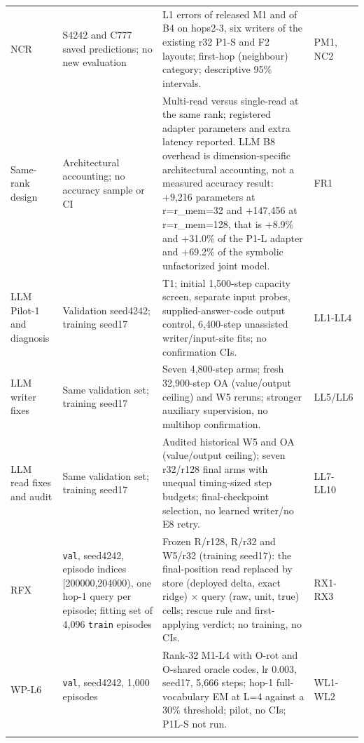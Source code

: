 {\begin{longtable}{W{83}{8}W{346}{8}W{487}{8}W{83}{8}}
NCR & S4242 and C777 saved predictions; no new evaluation & L1 errors of released M1 and of B4 on hops2-3, six writers of the existing r32 P1-S and F2 layouts; first-hop (neighbour) category; descriptive 95\% intervals. & PM1, NC2 \\ \addlinespace[3pt]  %
Same-rank design & Architectural accounting; no accuracy sample or CI & Multi-read versus single-read at the same rank; registered adapter parameters and extra latency reported. LLM B8 overhead is dimension-specific architectural accounting, not a measured accuracy result: +9,216 parameters at r=r\_mem=32 and +147,456 at r=r\_mem=128, that is +8.9\% and +31.0\% of the P1-L adapter and +69.2\% of the symbolic unfactorized joint model. & FR1 \\ \addlinespace[3pt]  %
LLM Pilot-1 and diagnosis & Validation seed4242; training seed17 & T1; initial 1,500-step capacity screen, separate input probes, supplied-answer-code output control, 6,400-step unassisted writer/\allowbreak{}input-site fits; no confirmation CIs. & LL1-LL4 \\ \addlinespace[3pt]  %
LLM writer fixes & Same validation set; training seed17 & Seven 4,800-step arms; fresh 32,900-step OA (value/\allowbreak{}output ceiling) and W5 reruns; stronger auxiliary supervision, no multihop confirmation. & LL5/\allowbreak{}LL6 \\ \addlinespace[3pt]  %
LLM read fixes and audit & Same validation set; training seed17 & Audited historical W5 and OA (value/\allowbreak{}output ceiling); seven r32/\allowbreak{}r128 final arms with unequal timing-sized step budgets; final-checkpoint selection, no learned writer/\allowbreak{}no E8 retry. & LL7-LL10 \\ \addlinespace[3pt]  %
RFX & \texttt{val}, seed4242, episode indices [200000,204000), one hop-1 query per episode; fitting set of 4,096 \texttt{train} episodes & Frozen R/\allowbreak{}r128, R/\allowbreak{}r32 and W5/\allowbreak{}r32 (training seed17): the final-position read replaced by store (deployed delta, exact ridge) \ensuremath{\times} query (raw, unit, true) cells; rescue rule and first-applying verdict; no training, no CIs. & RX1-RX3 \\ \addlinespace[3pt]  %
WP-L6 & \texttt{val}, seed4242, 1,000 episodes & Rank-32 M1-L4 with O-rot and O-shared oracle codes, lr 0.003, seed17, 5,666 steps; hop-1 full-vocabulary EM at L=4 against a 30\% threshold; pilot, no CIs; P1L-S not run. & WL1-WL2 \\ \addlinespace[3pt]  %

\end{longtable}}
